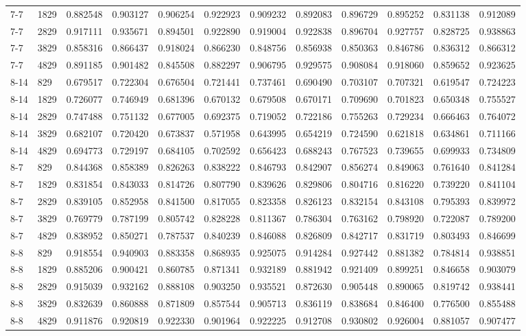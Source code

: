 \begin{longtable}{llrrrrrrrrrr}
7-7 & 1829 & 0.882548 & 0.903127 & 0.906254 & 0.922923 & 0.909232 & 0.892083 & 0.896729 & 0.895252 & 0.831138 & 0.912089\\
7-7 & 2829 & 0.917111 & 0.935671 & 0.894501 & 0.922890 & 0.919004 & 0.922838 & 0.896704 & 0.927757 & 0.828725 & 0.938863\\
7-7 & 3829 & 0.858316 & 0.866437 & 0.918024 & 0.866230 & 0.848756 & 0.856938 & 0.850363 & 0.846786 & 0.836312 & 0.866312\\
7-7 & 4829 & 0.891185 & 0.901482 & 0.845508 & 0.882297 & 0.906795 & 0.929575 & 0.908084 & 0.918060 & 0.859652 & 0.923625\\
8-14 & 829 & 0.679517 & 0.722304 & 0.676504 & 0.721441 & 0.737461 & 0.690490 & 0.703107 & 0.707321 & 0.619547 & 0.724223\\
8-14 & 1829 & 0.726077 & 0.746949 & 0.681396 & 0.670132 & 0.679508 & 0.670171 & 0.709690 & 0.701823 & 0.650348 & 0.755527\\
8-14 & 2829 & 0.747488 & 0.751132 & 0.677005 & 0.692375 & 0.719052 & 0.722186 & 0.755263 & 0.729234 & 0.666463 & 0.764072\\
8-14 & 3829 & 0.682107 & 0.720420 & 0.673837 & 0.571958 & 0.643995 & 0.654219 & 0.724590 & 0.621818 & 0.634861 & 0.711166\\
8-14 & 4829 & 0.694773 & 0.729197 & 0.684105 & 0.702592 & 0.656423 & 0.688243 & 0.767523 & 0.739655 & 0.699933 & 0.734809\\
8-7 & 829 & 0.844368 & 0.858389 & 0.826263 & 0.838222 & 0.846793 & 0.842907 & 0.856274 & 0.849063 & 0.761640 & 0.841284\\
8-7 & 1829 & 0.831854 & 0.843033 & 0.814726 & 0.807790 & 0.839626 & 0.829806 & 0.804716 & 0.816220 & 0.739220 & 0.841104\\
8-7 & 2829 & 0.839105 & 0.852958 & 0.841500 & 0.817055 & 0.823358 & 0.826123 & 0.832154 & 0.843108 & 0.795393 & 0.839972\\
8-7 & 3829 & 0.769779 & 0.787199 & 0.805742 & 0.828228 & 0.811367 & 0.786304 & 0.763162 & 0.798920 & 0.722087 & 0.789200\\
8-7 & 4829 & 0.838952 & 0.850271 & 0.787537 & 0.840239 & 0.846088 & 0.826809 & 0.842717 & 0.831719 & 0.803493 & 0.846699\\
8-8 & 829 & 0.918554 & 0.940903 & 0.883358 & 0.868935 & 0.925075 & 0.914284 & 0.927442 & 0.881382 & 0.784814 & 0.938851\\
8-8 & 1829 & 0.885206 & 0.900421 & 0.860785 & 0.871341 & 0.932189 & 0.881942 & 0.921409 & 0.899251 & 0.846658 & 0.903079\\
8-8 & 2829 & 0.915039 & 0.932162 & 0.888108 & 0.903250 & 0.935521 & 0.872630 & 0.905448 & 0.890065 & 0.819742 & 0.938441\\
8-8 & 3829 & 0.832639 & 0.860888 & 0.871809 & 0.857544 & 0.905713 & 0.836119 & 0.838684 & 0.846400 & 0.776500 & 0.855488\\
8-8 & 4829 & 0.911876 & 0.920819 & 0.922330 & 0.901964 & 0.922225 & 0.912708 & 0.930802 & 0.926004 & 0.881057 & 0.907477\\
\end{longtable}
